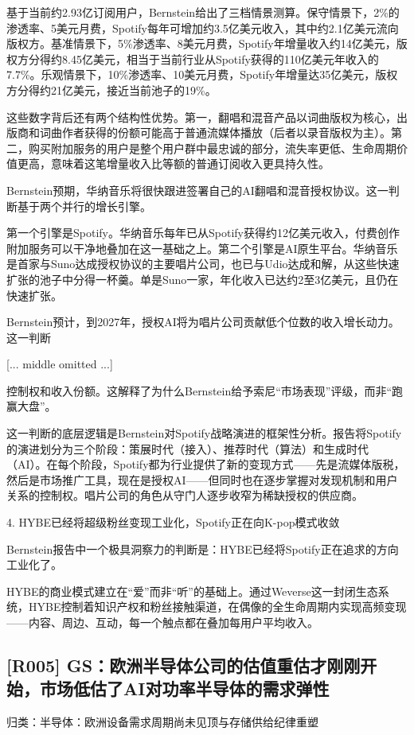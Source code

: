 \documentclass[11pt]{ctexart}
\begin{document}
基于当前约2.93亿订阅用户，Bernstein给出了三档情景测算。保守情景下，2\%的渗透率、5美元月费，Spotify每年可增加约3.5亿美元收入，其中约2.1亿美元流向版权方。基准情景下，5\%渗透率、8美元月费，Spotify年增量收入约14亿美元，版权方分得约8.45亿美元，相当于当前行业从Spotify获得的110亿美元年收入的7.7\%。乐观情景下，10\%渗透率、10美元月费，Spotify年增量达35亿美元，版权方分得约21亿美元，接近当前池子的19\%。

这些数字背后还有两个结构性优势。第一，翻唱和混音产品以词曲版权为核心，出版商和词曲作者获得的份额可能高于普通流媒体播放（后者以录音版权为主）。第二，购买附加服务的用户是整个用户群中最忠诚的部分，流失率更低、生命周期价值更高，意味着这笔增量收入比等额的普通订阅收入更具持久性。

Bernstein预期，华纳音乐将很快跟进签署自己的AI翻唱和混音授权协议。这一判断基于两个并行的增长引擎。

第一个引擎是Spotify。华纳音乐每年已从Spotify获得约12亿美元收入，付费创作附加服务可以干净地叠加在这一基础之上。第二个引擎是AI原生平台。华纳音乐是首家与Suno达成授权协议的主要唱片公司，也已与Udio达成和解，从这些快速扩张的池子中分得一杯羹。单是Suno一家，年化收入已达约2至3亿美元，且仍在快速扩张。

Bernstein预计，到2027年，授权AI将为唱片公司贡献低个位数的收入增长动力。这一判断

[... middle omitted ...]

控制权和收入份额。这解释了为什么Bernstein给予索尼“市场表现”评级，而非“跑赢大盘”。

这一判断的底层逻辑是Bernstein对Spotify战略演进的框架性分析。报告将Spotify的演进划分为三个阶段：策展时代（接入）、推荐时代（算法）和生成时代（AI）。在每个阶段，Spotify都为行业提供了新的变现方式——先是流媒体版税，然后是市场推广工具，现在是授权AI——但同时也在逐步掌握对发现机制和用户关系的控制权。唱片公司的角色从守门人逐步收窄为稀缺授权的供应商。

4. HYBE已经将超级粉丝变现工业化，Spotify正在向K-pop模式收敛

Bernstein报告中一个极具洞察力的判断是：HYBE已经将Spotify正在追求的方向工业化了。

HYBE的商业模式建立在“爱”而非“听”的基础上。通过Weverse这一封闭生态系统，HYBE控制着知识产权和粉丝接触渠道，在偶像的全生命周期内实现高频变现——内容、周边、互动，每一个触点都在叠加每用户平均收入。

\subsection{[R005] GS：欧洲半导体公司的估值重估才刚刚开始，市场低估了AI对功率半导体的需求弹性}
{\small\color{refgray}归类：半导体：欧洲设备需求周期尚未见顶与存储供给纪律重塑}
\end{document}
